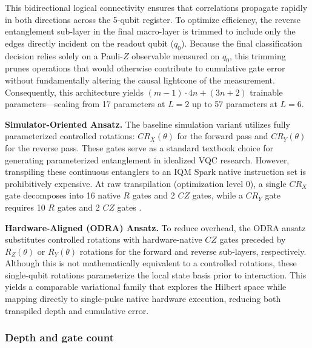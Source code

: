 \documentclass[11pt]{article}
\begin{document}
This bidirectional logical connectivity ensures that correlations propagate rapidly in both directions across the 5-qubit register. To optimize efficiency, the reverse entanglement sub-layer in the final macro-layer is trimmed to include only the edges directly incident on the readout qubit ($q_0$). Because the final classification decision relies solely on a Pauli-$Z$ observable measured on $q_0$, this trimming prunes operations that would otherwise contribute to cumulative gate error without fundamentally altering the causal lightcone of the measurement. Consequently, this architecture yields $(m-1) \cdot 4n + (3n+2)$ trainable parameters—scaling from 17 parameters at $L=2$ up to 57 parameters at $L=6$.

\textbf{Simulator-Oriented Ansatz.} The baseline simulation variant \cite{havlicek2019} utilizes fully parameterized controlled rotations: $CR_X(\theta)$ for the forward pass and $CR_Y(\theta)$ for the reverse pass. These gates serve as a standard textbook choice for generating parameterized entanglement in idealized VQC research. However, transpiling these continuous entanglers to an IQM Spark native instruction set is prohibitively expensive. At raw transpilation (optimization level 0), a single $CR_X$ gate decomposes into 16 native $R$ gates and 2 $CZ$ gates, while a $CR_Y$ gate requires 10 $R$ gates and 2 $CZ$ gates  \cite{qc1repo}.

\textbf{Hardware-Aligned (ODRA) Ansatz.}
To reduce overhead, the ODRA ansatz~\cite{abbas2021} substitutes controlled rotations with hardware-native $CZ$ gates preceded by $R_Z(\theta)$ or $R_Y(\theta)$ rotations for the forward and reverse sub-layers, respectively. Although this is not mathematically equivalent to a controlled rotations, these single-qubit rotations parameterize the local state basis prior to interaction. This yields a comparable variational family that explores the Hilbert space while mapping directly to single-pulse native hardware execution, reducing both transpiled depth and cumulative error.

\subsubsection{Depth and gate count}
\end{document}
